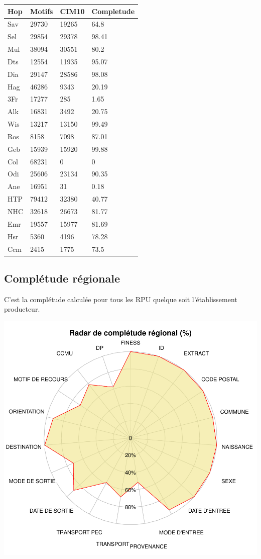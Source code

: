 \documentclass[]{article}
\begin{document}
\begin{longtable}[c]{@{}llll@{}}
\toprule
Hop & Motifs & CIM10 & Completude\tabularnewline
\midrule
\endhead
Sav & 29730 & 19265 & 64.8\tabularnewline
Sel & 29854 & 29378 & 98.41\tabularnewline
Mul & 38094 & 30551 & 80.2\tabularnewline
Dts & 12554 & 11935 & 95.07\tabularnewline
Dia & 29147 & 28586 & 98.08\tabularnewline
Hag & 46286 & 9343 & 20.19\tabularnewline
3Fr & 17277 & 285 & 1.65\tabularnewline
Alk & 16831 & 3492 & 20.75\tabularnewline
Wis & 13217 & 13150 & 99.49\tabularnewline
Ros & 8158 & 7098 & 87.01\tabularnewline
Geb & 15939 & 15920 & 99.88\tabularnewline
Col & 68231 & 0 & 0\tabularnewline
Odi & 25606 & 23134 & 90.35\tabularnewline
Ane & 16951 & 31 & 0.18\tabularnewline
HTP & 79412 & 32380 & 40.77\tabularnewline
NHC & 32618 & 26673 & 81.77\tabularnewline
Emr & 19557 & 15977 & 81.69\tabularnewline
Hsr & 5360 & 4196 & 78.28\tabularnewline
Ccm & 2415 & 1775 & 73.5\tabularnewline
\bottomrule
\end{longtable}

\subsection{Complétude régionale}\label{completude-regionale}

C'est la complétude calculée pour tous les RPU quelque soit
l'établissement producteur.

\includegraphics{completude_files/figure-latex/comp_regionale-1.pdf}
\end{document}
